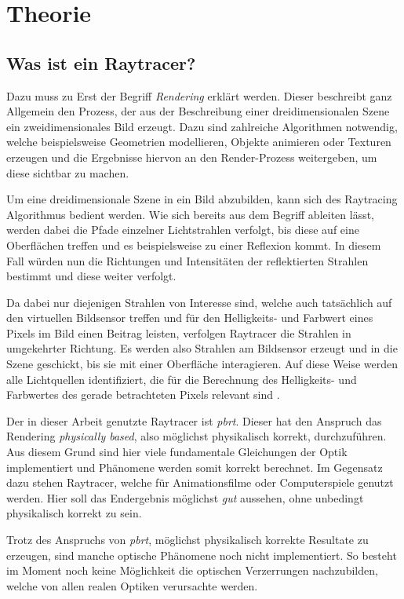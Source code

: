 \section{Theorie}

\subsection{Was ist ein Raytracer?}\label{sec:Raytracer}

Dazu muss zu Erst der Begriff \textit{Rendering} erklärt werden. Dieser beschreibt ganz Allgemein den Prozess, der aus der Beschreibung einer dreidimensionalen Szene ein zweidimensionales Bild erzeugt. Dazu sind zahlreiche Algorithmen notwendig, welche beispielsweise Geometrien modellieren, Objekte animieren oder Texturen erzeugen und die Ergebnisse hiervon an den Render-Prozess weitergeben, um diese sichtbar zu machen. 

Um eine dreidimensionale Szene in ein Bild abzubilden, kann sich des Raytracing Algorithmus bedient werden. Wie sich bereits aus dem Begriff ableiten lässt, werden dabei die Pfade einzelner \glqq Lichtstrahlen\grqq{ } verfolgt, bis diese auf eine Oberflächen treffen und es beispielsweise zu einer Reflexion kommt. In diesem Fall würden nun die Richtungen und Intensitäten der reflektierten Strahlen bestimmt und diese weiter verfolgt.

Da dabei nur diejenigen Strahlen von Interesse sind, welche auch tatsächlich auf den virtuellen Bildsensor treffen und für den Helligkeits- und Farbwert eines Pixels im Bild einen Beitrag leisten, verfolgen Raytracer die Strahlen in umgekehrter Richtung. Es werden also Strahlen am Bildsensor erzeugt und in die Szene geschickt, bis sie mit einer Oberfläche interagieren. Auf diese Weise werden alle Lichtquellen identifiziert, die für die Berechnung des Helligkeits- und Farbwertes des gerade betrachteten Pixels relevant sind \cite{pbrt_book}. 

Der in dieser Arbeit genutzte Raytracer ist \textit{pbrt}\cite{pbrt}. Dieser hat den Anspruch das Rendering \textit{physically based}, also möglichst physikalisch korrekt, durchzuführen. Aus diesem Grund sind hier viele fundamentale Gleichungen der Optik implementiert und Phänomene werden somit korrekt berechnet. Im Gegensatz dazu stehen Raytracer, welche für Animationsfilme oder Computerspiele genutzt werden. Hier soll das Endergebnis möglichst \textit{gut} aussehen, ohne unbedingt physikalisch korrekt zu sein. 

Trotz des Anspruchs von \textit{pbrt}, möglichst physikalisch korrekte Resultate zu erzeugen, sind manche optische Phänomene noch nicht implementiert. So besteht im Moment noch keine Möglichkeit die optischen Verzerrungen nachzubilden, welche von allen realen Optiken verursachte werden.

